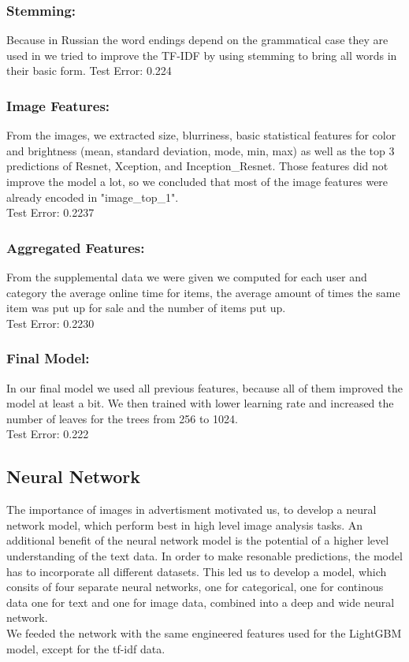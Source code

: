 \documentclass[runningheads]{llncs}
\begin{document}
\subsubsection{Stemming:} Because in Russian the word endings depend on the grammatical case they are used in we tried to improve the TF-IDF by using stemming to bring all words in their basic form.
Test Error: 0.224
\subsubsection{Image Features:} From the images, we extracted size, blurriness, basic statistical features for color and brightness (mean, standard deviation, mode, min, max) as well as the top 3 predictions of Resnet, Xception, and Inception\_Resnet. Those features did not improve the model a lot, so we concluded that most of the image features were already encoded in "image\_top\_1".\\
Test Error: 0.2237 
\subsubsection{Aggregated Features:} From the supplemental data we were given we computed for each user and category the average online time for items, the average amount of times the same item was put up for sale and the number of items put up.\\
Test Error: 0.2230
\subsubsection{Final Model:} In our final model we used all previous features, because all of them improved the model at least a bit. We then trained with lower learning rate and increased the number of leaves for the trees from 256 to 1024.\\
Test Error: 0.222




\subsection{Neural Network}
 The importance of images in advertisment motivated us, to develop a neural network model, which perform best in high level image analysis tasks. An additional benefit of the neural network model is the potential of a higher level understanding of the text data. In order to make resonable predictions, the model has to incorporate all different datasets. This led us to develop a  model, which consits of four separate neural networks, one for categorical, one for continous data one for text and one for image data, combined into a deep and wide neural network.\\
  We feeded the network with the same engineered features used for the  LightGBM model, except for the tf-idf data.
  
\end{document}
